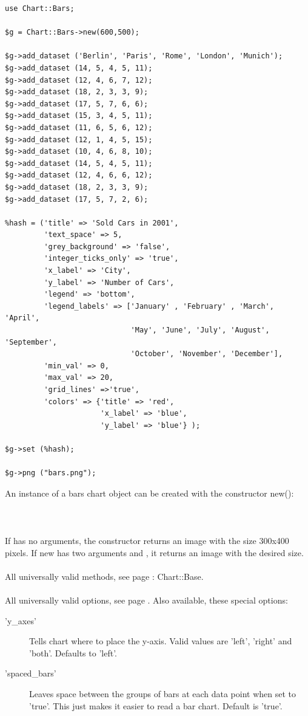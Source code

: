 \begin{verbatim}
use Chart::Bars;

$g = Chart::Bars->new(600,500);

$g->add_dataset ('Berlin', 'Paris', 'Rome', 'London', 'Munich');
$g->add_dataset (14, 5, 4, 5, 11);
$g->add_dataset (12, 4, 6, 7, 12);
$g->add_dataset (18, 2, 3, 3, 9);
$g->add_dataset (17, 5, 7, 6, 6);
$g->add_dataset (15, 3, 4, 5, 11);
$g->add_dataset (11, 6, 5, 6, 12);
$g->add_dataset (12, 1, 4, 5, 15);
$g->add_dataset (10, 4, 6, 8, 10);
$g->add_dataset (14, 5, 4, 5, 11);
$g->add_dataset (12, 4, 6, 6, 12);
$g->add_dataset (18, 2, 3, 3, 9);
$g->add_dataset (17, 5, 7, 2, 6);

%hash = ('title' => 'Sold Cars in 2001',
         'text_space' => 5,
         'grey_background' => 'false',
         'integer_ticks_only' => 'true',
         'x_label' => 'City',
         'y_label' => 'Number of Cars',
         'legend' => 'bottom',
         'legend_labels' => ['January' , 'February' , 'March', 'April',
                             'May', 'June', 'July', 'August', 'September',
                             'October', 'November', 'December'],
         'min_val' => 0,
         'max_val' => 20,
         'grid_lines' =>'true',
         'colors' => {'title' => 'red',
                      'x_label' => 'blue',
                      'y_label' => 'blue'} );

$g->set (%hash);

$g->png ("bars.png");

\end{verbatim}
 An instance of a bars chart object can be created with the constructor new():\\
\\
\\
\\
If  has no arguments, the constructor returns an image with the size 300x400 pixels. If new has two arguments  and , it returns an image with the desired size. \\ 
\\ 
All universally valid methods, see page \pageref{methods}: Chart::Base. \\
\\
 All universally valid options, see page \pageref{options}. Also available, these special options:
\begin{description}
\item['y\_axes'] Tells chart where to place the y-axis. Valid values are 'left', 'right' and 'both'. Defaults to 'left'.
\item['spaced\_bars']Leaves space between the groups of bars at each data point when set to 'true'.  This just makes it easier to read a bar chart.  Default is 'true'.
\end{description}